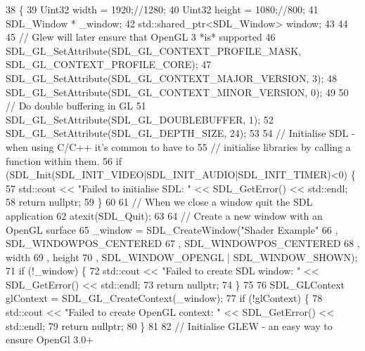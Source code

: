 \begin{DoxyCode}
38                                               \{
39         Uint32 width = 1920;\textcolor{comment}{//1280;}
40         Uint32 height = 1080;\textcolor{comment}{//800;}
41         SDL\_Window * \_window;
42         std::shared\_ptr<SDL\_Window> window;
43   
44 
45         \textcolor{comment}{// Glew will later ensure that OpenGL 3 *is* supported}
46         SDL\_GL\_SetAttribute(SDL\_GL\_CONTEXT\_PROFILE\_MASK, SDL\_GL\_CONTEXT\_PROFILE\_CORE);
47         SDL\_GL\_SetAttribute(SDL\_GL\_CONTEXT\_MAJOR\_VERSION, 3);
48         SDL\_GL\_SetAttribute(SDL\_GL\_CONTEXT\_MINOR\_VERSION, 0);
49 
50         \textcolor{comment}{// Do double buffering in GL}
51         SDL\_GL\_SetAttribute(SDL\_GL\_DOUBLEBUFFER, 1);
52         SDL\_GL\_SetAttribute(SDL\_GL\_DEPTH\_SIZE, 24);
53  
54         \textcolor{comment}{// Initialise SDL - when using C/C++ it's common to have to}
55         \textcolor{comment}{// initialise libraries by calling a function within them.}
56         \textcolor{keywordflow}{if} (SDL\_Init(SDL\_INIT\_VIDEO|SDL\_INIT\_AUDIO|SDL\_INIT\_TIMER)<0) \{
57                 std::cout << \textcolor{stringliteral}{"Failed to initialise SDL: "} << SDL\_GetError() << std::endl;
58         \textcolor{keywordflow}{return} \textcolor{keyword}{nullptr};
59         \}
60 
61         \textcolor{comment}{// When we close a window quit the SDL application}
62         atexit(SDL\_Quit);
63 
64         \textcolor{comment}{// Create a new window with an OpenGL surface}
65         \_window = SDL\_CreateWindow(\textcolor{stringliteral}{"Shader Example"}
66                                    , SDL\_WINDOWPOS\_CENTERED
67                                    , SDL\_WINDOWPOS\_CENTERED
68                                    , width
69                                    , height
70                                    , SDL\_WINDOW\_OPENGL | SDL\_WINDOW\_SHOWN);
71         \textcolor{keywordflow}{if} (!\_window) \{
72                 std::cout << \textcolor{stringliteral}{"Failed to create SDL window: "} << SDL\_GetError() << std::endl;
73                 \textcolor{keywordflow}{return} \textcolor{keyword}{nullptr};
74         \}
75 
76         SDL\_GLContext glContext = SDL\_GL\_CreateContext(\_window);
77         \textcolor{keywordflow}{if} (!glContext) \{
78                 std::cout << \textcolor{stringliteral}{"Failed to create OpenGL context: "} << SDL\_GetError() << std::endl;
79                 \textcolor{keywordflow}{return} \textcolor{keyword}{nullptr};
80         \}
81 
82         \textcolor{comment}{// Initialise GLEW - an easy way to ensure OpenGl 3.0+}

\end{DoxyCode}
